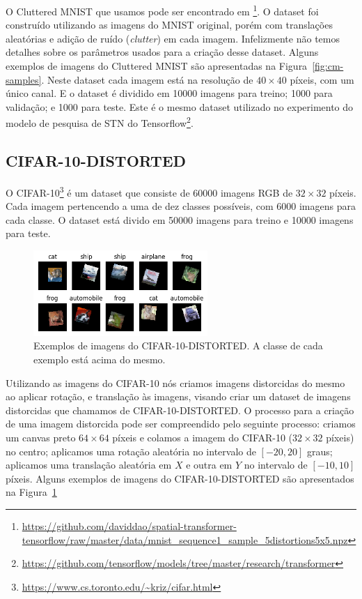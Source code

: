 \documentclass[conference]{IEEEtran}
\begin{document}
O Cluttered MNIST que usamos pode ser encontrado em \footnote{\url{https://github.com/daviddao/spatial-transformer-tensorflow/raw/master/data/mnist_sequence1_sample_5distortions5x5.npz}}. O dataset foi construído utilizando as imagens do MNIST original, porém com translações aleatórias e adição de ruído (\textit{clutter}) em cada imagem. Infelizmente não temos detalhes sobre os parâmetros usados para a criação desse dataset. Alguns exemplos de imagens do Cluttered MNIST são apresentadas na Figura~\ref{fig:cm-samples}. Neste dataset cada imagem está na resolução de $40\times40$ píxeis, com um único canal.
E o dataset é dividido em 10000 imagens para treino; 1000 para validação; e 1000 para teste.
Este é o mesmo dataset utilizado no experimento do modelo de pesquisa de STN do Tensorflow\footnote{\url{https://github.com/tensorflow/models/tree/master/research/transformer}}.



\subsection{CIFAR-10-DISTORTED}

O CIFAR-10\footnote{\url{https://www.cs.toronto.edu/~kriz/cifar.html}} é um dataset que consiste de 60000 imagens RGB de $32\times32$ píxeis. Cada imagem pertencendo a uma de dez classes possíveis, com 6000 imagens para cada classe. O dataset está divido em 50000 imagens para treino e 10000 imagens para teste.

\begin{figure}[ht!]
  \centering
  \includegraphics[width=250px]{img/C10D-samples.png}
  \caption{Exemplos de imagens do CIFAR-10-DISTORTED. A classe de cada exemplo está acima do mesmo.}
  \label{fig:c10d-samples}
\end{figure}

Utilizando as imagens do CIFAR-10 nós criamos imagens distorcidas do mesmo ao aplicar rotação, e translação às imagens, visando criar um dataset de imagens distorcidas que chamamos de CIFAR-10-DISTORTED. O processo para a criação de uma imagem distorcida pode ser compreendido pelo seguinte processo: criamos um canvas preto $64\times64$ píxeis e colamos a imagem do CIFAR-10 ($32\times32$ píxeis) no centro; aplicamos uma rotação aleatória no intervalo de $[-20, 20]$ graus; aplicamos uma translação aleatória em $X$ e outra em $Y$ no intervalo de $[-10, 10]$ píxeis. Alguns exemplos de imagens do CIFAR-10-DISTORTED são apresentados na Figura~\ref{fig:c10d-samples}
\end{document}
